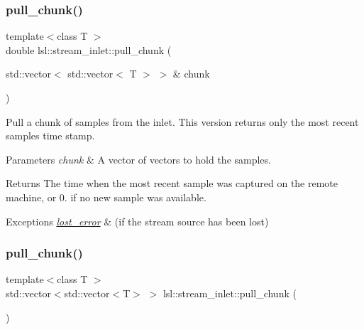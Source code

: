 \subsubsection{\texorpdfstring{pull\+\_\+chunk()}{pull\_chunk()}\hspace{0.1cm}{\footnotesize\ttfamily [2/3]}}
{\footnotesize\ttfamily template$<$class T $>$ \\
double lsl\+::stream\+\_\+inlet\+::pull\+\_\+chunk (\begin{DoxyParamCaption}\item[{std\+::vector$<$ std\+::vector$<$ T $>$ $>$ \&}]{chunk }\end{DoxyParamCaption})\hspace{0.3cm}{\ttfamily [inline]}}

Pull a chunk of samples from the inlet. This version returns only the most recent sample\textquotesingle{}s time stamp. 
\begin{DoxyParams}{Parameters}
{\em chunk} & A vector of vectors to hold the samples. \\
\hline
\end{DoxyParams}
\begin{DoxyReturn}{Returns}
The time when the most recent sample was captured on the remote machine, or 0. if no new sample was available. 
\end{DoxyReturn}

\begin{DoxyExceptions}{Exceptions}
{\em \hyperlink{classlsl_1_1lost__error}{lost\+\_\+error}} & (if the stream source has been lost) \\
\hline
\end{DoxyExceptions}
\mbox{\label{classlsl_1_1stream__inlet_a558f53812f5dc3c19b2cbe0026a61f6a}} 
\subsubsection{\texorpdfstring{pull\+\_\+chunk()}{pull\_chunk()}\hspace{0.1cm}{\footnotesize\ttfamily [3/3]}}
{\footnotesize\ttfamily template$<$class T $>$ \\
std\+::vector$<$std\+::vector$<$T$>$ $>$ lsl\+::stream\+\_\+inlet\+::pull\+\_\+chunk (\begin{DoxyParamCaption}{ }\end{DoxyParamCaption})\hspace{0.3cm}{\ttfamily [inline]}}

